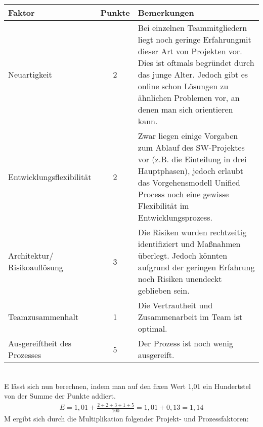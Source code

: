 \documentclass[../review_1.tex]{subfiles}
\begin{document}
\begin{tabular}[h] {l c p{8.0cm}}
    \textbf{Faktor}              & \textbf{Punkte} & \textbf{Bemerkungen}                                                                                                                                                                                                                               \\ \toprule
    Neuartigkeit                 & 2               & Bei einzelnen Teammitgliedern liegt noch geringe Erfahrungmit dieser Art von Projekten vor. Dies ist oftmals begründet durch das junge Alter. Jedoch gibt es online schon Lösungen zu ähnlichen Problemen vor, an denen man sich orientieren kann. \\ 
    Entwicklungsflexibilität     & 2               & Zwar liegen einige Vorgaben zum Ablauf des SW-Projektes vor (z.B. die Einteilung in drei Hauptphasen), jedoch erlaubt das Vorgehensmodell Unified Process noch eine gewisse Flexibilität im Entwicklungsprozess.                                   \\ 
    Architektur/ Risikoauflösung & 3               & Die Risiken wurden rechtzeitig identifiziert und Maßnahmen überlegt. Jedoch könnten aufgrund der geringen Erfahrung noch Risiken unendeckt geblieben sein.                                                                                         \\
    Teamzusammenhalt             & 1               & Die Vertrautheit und Zusammenarbeit im Team ist optimal.                                                                                                                                                                                           \\
    Ausgereiftheit des Prozesses & 5               & Der Prozess ist noch wenig ausgereift.                                                                                                                                                                                                             \\
\end{tabular} \\ \newline
E lässt sich nun berechnen, indem man auf den fixen Wert 1,01  ein Hundertstel von der Summe der Punkte addiert.
\begin{align*}
    E = 1,01 + \frac{2+2+3+1+5}{100}= 1,01 + 0,13 = 1,14
\end{align*}
M ergibt sich durch die Multiplikation folgender Projekt- und Prozessfaktoren:
\end{document}
